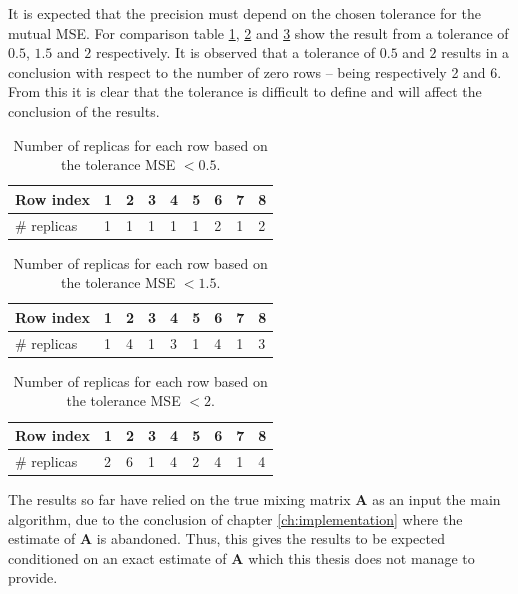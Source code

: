 \noindent
It is expected that the precision must depend on the chosen tolerance for the mutual MSE. 
For comparison table \ref{tab:replica2}, \ref{tab:replica3} and \ref{tab:replica4} show the result from a tolerance of $0.5$, $1.5$ and $2$ respectively. 
It is observed that a tolerance of $0.5$ and $2$ results in a conclusion with respect to the number of zero rows -- being respectively 2 and 6. 
From this it is clear that the tolerance is difficult to define and will affect the conclusion of the results.  
\begin{table}[H]
\center
\begin{tabular}{|l|l|l|l|l|l|l|l|l|}
\hline
Row index   & 1 & 2 & 3 & 4 & 5 & 6 & 7 & 8 \\ \hline
\# replicas & 1 & 1 & 1 & 1 & 1 & 2 & 1 & 2 \\ \hline
\end{tabular}
\caption{Number of replicas for each row based on the tolerance MSE $< 0.5$.}
\label{tab:replica2}
\end{table}
\noindent
\begin{table}[H]
\center
\begin{tabular}{|l|l|l|l|l|l|l|l|l|}
\hline
Row index   & 1 & 2 & 3 & 4 & 5 & 6 & 7 & 8 \\ \hline
\# replicas & 1 & 4 & 1 & 3 & 1 & 4 & 1 & 3 \\ \hline
\end{tabular}
\caption{Number of replicas for each row based on the tolerance MSE $< 1.5$.}
\label{tab:replica3}
\end{table}
\noindent
\begin{table}[H]
\center
\begin{tabular}{|l|l|l|l|l|l|l|l|l|}
\hline
Row index   & 1 & 2 & 3 & 4 & 5 & 6 & 7 & 8 \\ \hline
\# replicas & 2 & 6 & 1 & 4 & 2 & 4 & 1 & 4 \\ \hline
\end{tabular}
\caption{Number of replicas for each row based on the tolerance MSE $< 2$.}
\label{tab:replica4}
\end{table}
\noindent
The results so far have relied on the true mixing matrix $\mathbf{A}$ as an input the main algorithm, due to the conclusion of chapter \ref{ch:implementation} where the estimate of $\mathbf{A}$ is abandoned. 
Thus, this gives the results to be expected conditioned on an exact estimate of $\mathbf{A}$ which this thesis does not manage to provide.

